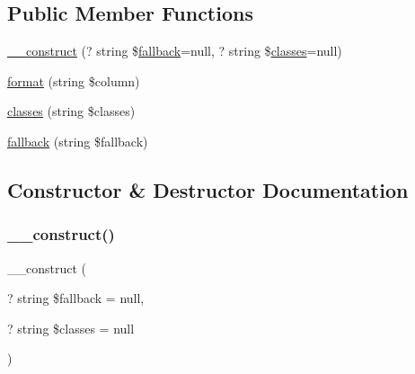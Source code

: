 \subsection*{Public Member Functions}
\begin{DoxyCompactItemize}
\item 
\hyperlink{classhamburgscleanest_1_1_data_tables_1_1_models_1_1_column_formatters_1_1_image_column_a25945d7e4950d1e19ee2a8792eea5a32}{\+\_\+\+\_\+construct} (? string \$\hyperlink{classhamburgscleanest_1_1_data_tables_1_1_models_1_1_column_formatters_1_1_image_column_aa390af8a4f2a813228e5ba9c49db2f79}{fallback}=null, ? string \$\hyperlink{classhamburgscleanest_1_1_data_tables_1_1_models_1_1_column_formatters_1_1_image_column_a813e5943086af6dacdea0ffc17b284d6}{classes}=null)
\item 
\hyperlink{classhamburgscleanest_1_1_data_tables_1_1_models_1_1_column_formatters_1_1_image_column_aba259f7ae8b25e70bd444020c04606e7}{format} (string \$column)
\item 
\hyperlink{classhamburgscleanest_1_1_data_tables_1_1_models_1_1_column_formatters_1_1_image_column_a813e5943086af6dacdea0ffc17b284d6}{classes} (string \$classes)
\item 
\hyperlink{classhamburgscleanest_1_1_data_tables_1_1_models_1_1_column_formatters_1_1_image_column_aa390af8a4f2a813228e5ba9c49db2f79}{fallback} (string \$fallback)
\end{DoxyCompactItemize}


\subsection{Constructor \& Destructor Documentation}
\mbox{\label{classhamburgscleanest_1_1_data_tables_1_1_models_1_1_column_formatters_1_1_image_column_a25945d7e4950d1e19ee2a8792eea5a32}} 
\subsubsection{\texorpdfstring{\+\_\+\+\_\+construct()}{\_\_construct()}}
{\footnotesize\ttfamily \+\_\+\+\_\+construct (\begin{DoxyParamCaption}\item[{? string}]{\$fallback = {\ttfamily null},  }\item[{? string}]{\$classes = {\ttfamily null} }\end{DoxyParamCaption})}

